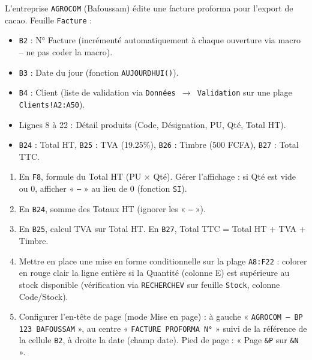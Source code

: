 \documentclass[11pt]{article}
\begin{document}
\begin{exercice}
L'entreprise \texttt{AGROCOM} (Bafoussam) édite une facture proforma pour l'export de cacao. Feuille \texttt{Facture} :
\begin{itemize}
    \item \texttt{B2} : N° Facture (incrémenté automatiquement à chaque ouverture via macro -- ne pas coder la macro).
    \item \texttt{B3} : Date du jour (fonction \texttt{AUJOURDHUI()}).
    \item \texttt{B4} : Client (liste de validation via \texttt{Données $\to$ Validation} sur une plage \texttt{Clients!A2:A50}).
    \item Lignes 8 à 22 : Détail produits (Code, Désignation, PU, Qté, Total HT).
    \item \texttt{B24} : Total HT, \texttt{B25} : TVA (19.25\%), \texttt{B26} : Timbre (500 FCFA), \texttt{B27} : Total TTC.
\end{itemize}
\begin{enumerate}
    \item En \texttt{F8}, formule du Total HT (PU $\times$ Qté). Gérer l'affichage : si Qté est vide ou 0, afficher « \texttt{---} » au lieu de 0 (fonction \texttt{SI}).
    \item En \texttt{B24}, somme des Totaux HT (ignorer les « \texttt{---} »).
    \item En \texttt{B25}, calcul TVA sur Total HT. En \texttt{B27}, Total TTC = Total HT + TVA + Timbre.
    \item Mettre en place une mise en forme conditionnelle sur la plage \texttt{A8:F22} : colorer en rouge clair la ligne entière si la Quantité (colonne E) est supérieure au stock disponible (vérification via \texttt{RECHERCHEV} sur feuille \texttt{Stock}, colonne Code/Stock).
    \item Configurer l'en-tête de page (mode Mise en page) : à gauche « \texttt{AGROCOM -- BP 123 BAFOUSSAM} », au centre « \texttt{FACTURE PROFORMA N°} » suivi de la référence de la cellule \texttt{B2}, à droite la date (champ date). Pied de page : « Page \texttt{\&P} sur \texttt{\&N} ».
\end{enumerate}
\end{exercice}
\end{document}

